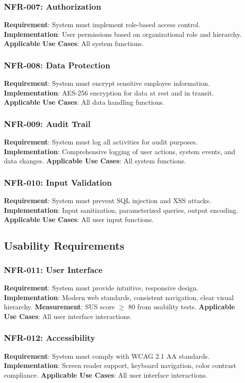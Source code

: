 \documentclass[12pt,a4paper]{article}
\begin{document}
\subsubsection{NFR-007: Authorization}
\textbf{Requirement}: System must implement role-based access control.
\textbf{Implementation}: User permissions based on organizational role and hierarchy.
\textbf{Applicable Use Cases}: All system functions.

\subsubsection{NFR-008: Data Protection}
\textbf{Requirement}: System must encrypt sensitive employee information.
\textbf{Implementation}: AES-256 encryption for data at rest and in transit.
\textbf{Applicable Use Cases}: All data handling functions.

\subsubsection{NFR-009: Audit Trail}
\textbf{Requirement}: System must log all activities for audit purposes.
\textbf{Implementation}: Comprehensive logging of user actions, system events, and data changes.
\textbf{Applicable Use Cases}: All system functions.

\subsubsection{NFR-010: Input Validation}
\textbf{Requirement}: System must prevent SQL injection and XSS attacks.
\textbf{Implementation}: Input sanitization, parameterized queries, output encoding.
\textbf{Applicable Use Cases}: All user input functions.

\subsection{Usability Requirements}

\subsubsection{NFR-011: User Interface}
\textbf{Requirement}: System must provide intuitive, responsive design.
\textbf{Implementation}: Modern web standards, consistent navigation, clear visual hierarchy.
\textbf{Measurement}: SUS score \(\geq\) 80 from usability tests.
\textbf{Applicable Use Cases}: All user interface interactions.

\subsubsection{NFR-012: Accessibility}
\textbf{Requirement}: System must comply with WCAG 2.1 AA standards.
\textbf{Implementation}: Screen reader support, keyboard navigation, color contrast compliance.
\textbf{Applicable Use Cases}: All user interface interactions.
\end{document}

